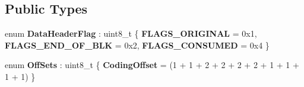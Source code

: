 \subsection*{Public Types}
\begin{DoxyCompactItemize}
\item 
enum {\bfseries Data\+Header\+Flag} \+: uint8\+\_\+t \{ {\bfseries F\+L\+A\+G\+S\+\_\+\+O\+R\+I\+G\+I\+N\+AL} = 0x1, 
{\bfseries F\+L\+A\+G\+S\+\_\+\+E\+N\+D\+\_\+\+O\+F\+\_\+\+B\+LK} = 0x2, 
{\bfseries F\+L\+A\+G\+S\+\_\+\+C\+O\+N\+S\+U\+M\+ED} = 0x4
 \}\hypertarget{struct_network_coding_1_1_header_1_1_data_ad108d30572fcdb4464fda2c035910b56}{}\label{struct_network_coding_1_1_header_1_1_data_ad108d30572fcdb4464fda2c035910b56}

\item 
enum {\bfseries Off\+Sets} \+: uint8\+\_\+t \{ {\bfseries Coding\+Offset} = (1 + 1 + 2 + 2 + 2 + 2 + 1 + 1 + 1 + 1)
 \}\hypertarget{struct_network_coding_1_1_header_1_1_data_a5e55347a78baeebc72fb402fd5e30bfc}{}\label{struct_network_coding_1_1_header_1_1_data_a5e55347a78baeebc72fb402fd5e30bfc}

\end{DoxyCompactItemize}
